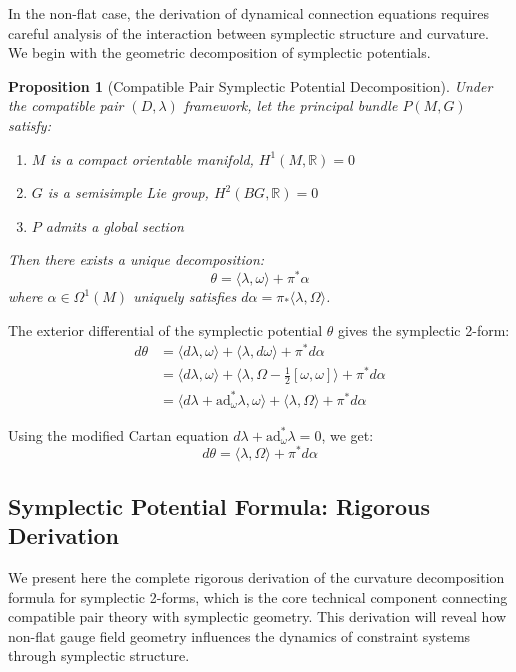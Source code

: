 \documentclass[a4paper,12pt]{extarticle}
\newtheorem{proposition}[theorem]{Proposition}
\theoremstyle{definition}
\begin{document}
In the non-flat case, the derivation of dynamical connection equations requires careful analysis of the interaction between symplectic structure and curvature. We begin with the geometric decomposition of symplectic potentials.

\begin{proposition}[Compatible Pair Symplectic Potential Decomposition\cite{zheng2025dynamical}]
Under the compatible pair $(D, \lambda)$ framework, let the principal bundle $P(M, G)$ satisfy:
\begin{enumerate}
\item $M$ is a compact orientable manifold, $H^1(M, \mathbb{R}) = 0$
\item $G$ is a semisimple Lie group, $H^2(BG, \mathbb{R}) = 0$
\item $P$ admits a global section
\end{enumerate}
Then there exists a unique decomposition:
$$\theta = \langle\lambda, \omega\rangle + \pi^*\alpha$$
where $\alpha \in \Omega^1(M)$ uniquely satisfies $d\alpha = \pi_*\langle\lambda, \Omega\rangle$.
\end{proposition}

The exterior differential of the symplectic potential $\theta$ gives the symplectic 2-form:
\begin{align}
d\theta &= \langle d\lambda, \omega\rangle + \langle\lambda, d\omega\rangle + \pi^* d\alpha\\
&= \langle d\lambda, \omega\rangle + \langle\lambda, \Omega - \frac{1}{2}[\omega, \omega]\rangle + \pi^* d\alpha\\
&= \langle d\lambda + \text{ad}_\omega^* \lambda, \omega\rangle + \langle\lambda, \Omega\rangle + \pi^* d\alpha
\end{align}

Using the modified Cartan equation $d\lambda + \text{ad}_\omega^* \lambda = 0$, we get:
$$d\theta = \langle\lambda, \Omega\rangle + \pi^* d\alpha$$

\subsection{Symplectic Potential Formula: Rigorous Derivation}

We present here the complete rigorous derivation of the curvature decomposition formula for symplectic 2-forms, which is the core technical component connecting compatible pair theory with symplectic geometry. This derivation will reveal how non-flat gauge field geometry influences the dynamics of constraint systems through symplectic structure.
\end{document}
